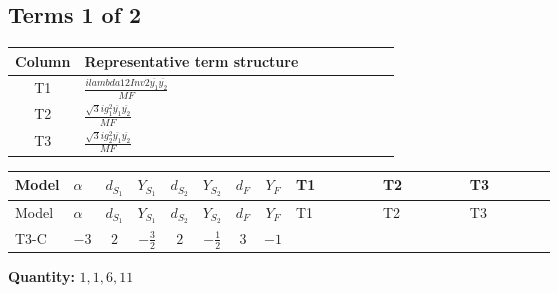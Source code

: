 \documentclass[8pt]{article}
\begin{document}
\begin{landscape}
\subsection*{Terms 1 of 2}
\begin{center}
\begin{tabular}{@{}c >{\raggedright\arraybackslash}p{0.82\linewidth}@{}}
\toprule
Column & Representative term structure \\
\midrule
T1 & \(\displaystyle \frac{i lambda12Inv2 \overline{y_{1}} \overline{y_{2}}}{MF}\) \\
\midrule
T2 & \(\displaystyle \frac{\sqrt{3} i g_{1}^{2} \overline{y_{1}} \overline{y_{2}}}{MF}\) \\
\midrule
T3 & \(\displaystyle \frac{\sqrt{3} i g_{2}^{2} \overline{y_{1}} \overline{y_{2}}}{MF}\) \\
\midrule
\bottomrule
\end{tabular}
\end{center}
\smallskip
\tiny
\begin{longtable}{@{}llcccccc >{\raggedright\arraybackslash}p{0.21\linewidth} >{\raggedright\arraybackslash}p{0.21\linewidth} >{\raggedright\arraybackslash}p{0.21\linewidth}@{}}
\toprule
Model & $\alpha$ & $d_{S_1}$ & $Y_{S_1}$ & $d_{S_2}$ & $Y_{S_2}$ & $d_F$ & $Y_F$ & T1 & T2 & T3 \\
\midrule
\endfirsthead
\toprule
Model & $\alpha$ & $d_{S_1}$ & $Y_{S_1}$ & $d_{S_2}$ & $Y_{S_2}$ & $d_F$ & $Y_F$ & T1 & T2 & T3 \\
\midrule
\endhead
T3-C & $-3$ & $2$ & $-\frac{3}{2}$ & $2$ & $-\frac{1}{2}$ & $3$ & $-1$ & \scriptsize\adjustbox{max width=\linewidth}{$\begin{gathered} - \frac{i lambda12Inv2 \overline{y_{1}} \overline{y_{2}}}{3 MF}\end{gathered}$} & \scriptsize\adjustbox{max width=\linewidth}{$\begin{gathered} - \frac{\sqrt{3} i g_{1}^{2} \overline{y_{1}} \overline{y_{2}}}{2 MF}\end{gathered}$} & \scriptsize\adjustbox{max width=\linewidth}{$\begin{gathered} - \frac{\sqrt{3} i g_{2}^{2} \overline{y_{1}} \overline{y_{2}}}{4 MF}\end{gathered}$} \\
\midrule
\bottomrule
\end{longtable}
\clearpage
\noindent\textbf{Quantity: }$\mathrm{1,1,6,11}$\par\smallskip

\end{landscape}
\end{document}

